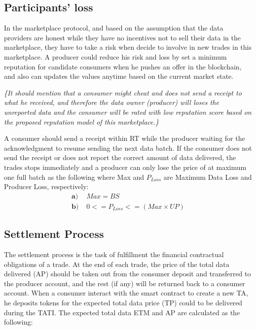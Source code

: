 \documentclass[letterpaper, 10 pt, conference]{ieeeconf}  %
\makeatletter
\newcommand{\mathleft}{\@fleqntrue\@mathmargin15pt}
\newcommand{\mynote}[1]{{\leavevmode\smaller\itshape\color{red}\{#1\}}}
\makeatother
\begin{document}
\subsection{Participants' loss} \label{ParLoss}
In the marketplace protocol, and based on the assumption that the data providers are honest while they have no incentives not to sell their data in the marketplace, they have to take a risk when decide to involve in new trades in this marketplace. A producer could reduce his risk and loss by set a minimum reputation for candidate consumers when he pushes an offer in the blockchain, and also can updates the values anytime based on the current market state. 

\mynote{It should mention that a consumer might cheat and does not send a receipt to what he received, and therefore the data owner (producer) will loses the unreported data and the consumer will be rated with low reputation score based on the proposed reputation model of this marketplace.}

A consumer should send a receipt within RT while the producer waiting for the acknowledgment to resume sending the next data batch. If the consumer does not send the receipt or does not report the correct amount of data delivered, the trades stops immediately and a producer can only lose the price of at maximum one full batch as the following where Max and $ P_{Loss} $ are Maximum Data Loss and Producer Loss, respectively:
\vspace{-0.1 cm}
\mathleft
\begin{align}
\textbf{a) } & Max = BS \nonumber\\
\textbf{b) }  & 0 <= P_{Loss} <= ( Max \times UP )\nonumber
\end{align}

\subsection{Settlement Process}

The settlement process is the task of fulfillment the financial contractual obligations of a trade.
At the end of each trade, the price of the total data delivered (AP) should be taken out from the consumer deposit and transferred to the producer account,  and the rest (if any) will be returned back to a consumer account. When a consumer interact with the smart contract to create a new TA, he deposits tokens for the expected total data price (TP) could to be delivered during the TATI. The expected total data  ETM  and AP are calculated as the following:
\end{document}
